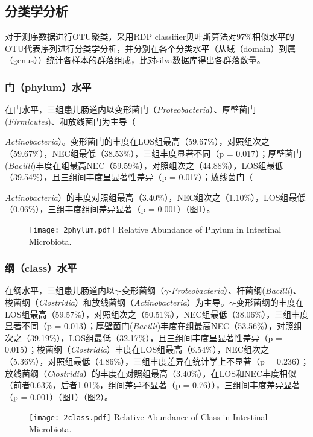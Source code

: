   \subsection{分类学分析}
  对于测序数据进行OTU聚类，采用RDP classifier贝叶斯算法对97\%相似水平的OTU代表序列进行分类学分析，并分别在各个分类水平（从域（domain）到属（genus））统计各样本的群落组成，比对silva数据库得出各群落数量。
    \subsubsection{门（phylum）水平}
    在门水平，三组患儿肠道内以变形菌门（\textit{Proteobacteria}）、厚壁菌门(\textit{Firmicutes})、和放线菌门为主导（{\textit{Actinobacteria}）。变形菌门的丰度在LOS组最高（59.67\%），对照组次之（59.67\%），NEC组最低（38.53\%），三组丰度显著不同（p = 0.017）；厚壁菌门(\textit{Bacilli})丰度在组最高NEC（59.59\%），对照组次之（44.88\%），LOS组最低（39.54\%），且三组间丰度呈显著性差异（p = 0.017）；放线菌门（{\textit{Actinobacteria}）的丰度对照组最高（3.40\%），NEC组次之（1.10\%），LOS组最低（0.06\%），三组丰度组间差异显著（p = 0.001）（图\ref{fig:2phylum}）。
      \begin{figure}[!htp]
        \centering
        \texttt{[image: 2phylum.pdf]}
          {Relative Abundance of Phylum in Intestinal Microbiota.}
        \label{fig:2phylum}
      \end{figure}

    \subsubsection{纲（class）水平}
    在纲水平，三组患儿肠道内以$\gamma$-变形菌纲（\textit{$\gamma$-Proteobacteria}）、杆菌纲(\textit{Bacilli})、梭菌纲（\textit{Clostridia}）和放线菌纲（\textit{Actinobacteria}）为主导。$\gamma$-变形菌纲的丰度在LOS组最高（59.57\%），对照组次之（50.51\%），NEC组最低（38.06\%），三组丰度显著不同（p = 0.013）；厚壁菌门(\textit{Bacilli})丰度在组最高NEC（53.56\%），对照组次之（39.19\%），LOS组最低（32.17\%），且三组间丰度呈显著性差异（p = 0.015）；梭菌纲（\textit{Clostridia}）丰度在LOS组最高（6.54\%），NEC组次之（5.36\%），对照组最低（4.86\%），三组丰度差异在统计学上不显著（p = 0.236）；放线菌纲（\textit{Clostridia}）的丰度在对照组最高（3.40\%），在LOS和NEC丰度相似（前者0.63\%，后者1.01\%，组间差异不显著（p = 0.76）），三组间丰度差异显著（p = 0.001）（图\ref{fig:2phylum}）（图\ref{fig:2class}）。
      \begin{figure}[!htp]
        \centering
        \texttt{[image: 2class.pdf]}
          {Relative Abundance of Class in Intestinal Microbiota.}
        \label{fig:2class}
      \end{figure}

}}
